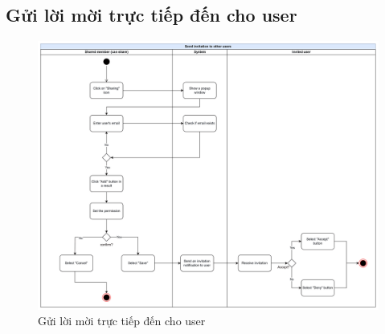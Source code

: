 \subsection{Gửi lời mời trực tiếp đến cho user}
    \begin{figure}[H]
        \centering
        \includegraphics[width=\linewidth]{Content/Phân tích và thiết kế hệ thống/documents/Sơ đồ hoạt động/images/sendInvitation.png}
        \vspace{0.5cm}
        \caption{Gửi lời mời trực tiếp đến cho user}
        \label{fig:Gửi lời mời trực tiếp đến cho user}
    \end{figure}